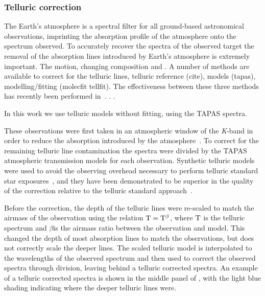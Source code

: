 \subsubsection{Telluric correction}
\label{subsec:telluric_correction}
The Earth's atmosphere is a spectral filter for all ground-based astronomical observations, imprinting the absorption profile of the atmosphere onto the spectrum observed. To accurately recover the spectra of the observed target the removal of the absorption lines introduced by Earth's atmosphere is extremely important. The motion, changing composition and .
A number of methods are available to correct for the telluric lines, telluric reference (cite), models (tapas), modelling/fitting (molecfit tellfit). The effectiveness between these three methods has recently been performed in~\cite{ulmer-moll_telluric_2018}. . .

In this work we use telluric models without fitting, using the {TAPAS} spectra.

These observations were first taken in an atmospheric window of the \emph{K}-band in order to reduce the absorption introduced by the atmosphere~\citep{barnes_hd_2008}.
 To correct for the remaining telluric line contamination the spectra were divided by the {TAPAS}\citep{bertaux_tapas_2014} atmospheric transmission models for each observation. Synthetic telluric models were used to avoid the observing overhead necessary to perform telluric standard star exposures~\citep{vacca_method_2003}, and they have been demonstrated to be superior in the quality of the correction relative to the telluric standard approach~\citep[e.g.,][]{cotton_atmospheric_2014}.

Before the correction, the depth of the telluric lines were re-scaled to match the airmass of the observation using the relation \(\rm T = T^{\beta}\), where \(\rm T\) is the telluric spectrum and \(\beta\)is the airmass ratio between the observation and model. This changed the depth of most absorption lines to match the observations, but does not correctly scale the deeper lines. The scaled telluric model is interpolated to the wavelengths of the observed spectrum and then used to correct the observed spectra through division, leaving behind a telluric corrected spectra. An example of a telluric corrected spectra is shown in the middle panel of , with the light blue shading indicating where the deeper telluric lines were.

